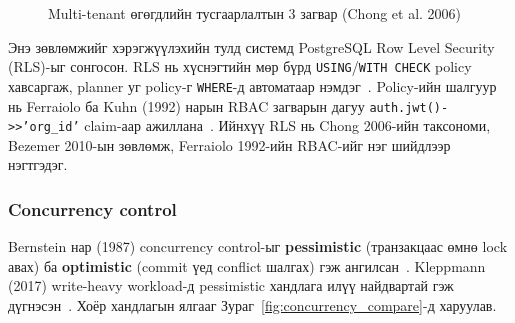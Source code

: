 \begin{figure}[H]
{
}
\caption{Multi-tenant өгөгдлийн тусгаарлалтын 3 загвар (Chong et al. 2006)}
\label{fig:multitenant_models}
\end{figure}

Энэ зөвлөмжийг хэрэгжүүлэхийн тулд системд PostgreSQL Row Level Security (RLS)-ыг сонгосон. RLS нь хүснэгтийн мөр бүрд \texttt{USING}/\texttt{WITH CHECK} policy хавсаргаж, planner уг policy-г \texttt{WHERE}-д автоматаар нэмдэг~\cite{postgresql2024rowsecurity}. Policy-ийн шалгуур нь Ferraiolo ба Kuhn (1992) нарын RBAC загварын дагуу \texttt{auth.jwt()->>'org\_id'} claim-аар ажиллана~\cite{ferraiolo1992rbac}. Ийнхүү RLS нь Chong 2006-ийн таксономи, Bezemer 2010-ын зөвлөмж, Ferraiolo 1992-ийн RBAC-ийг нэг шийдлээр нэгтгэдэг.

\subsubsection{Concurrency control}
\label{subsubsec:concurrency}

Bernstein нар (1987) concurrency control-ыг \textbf{pessimistic} (транзакцаас өмнө lock авах) ба \textbf{optimistic} (commit үед conflict шалгах) гэж ангилсан~\cite{bernstein1987concurrency}. Kleppmann (2017) write-heavy workload-д pessimistic хандлага илүү найдвартай гэж дүгнэсэн~\cite{kleppmann2017ddia}. Хоёр хандлагын ялгааг Зураг~\ref{fig:concurrency_compare}-д харуулав.

